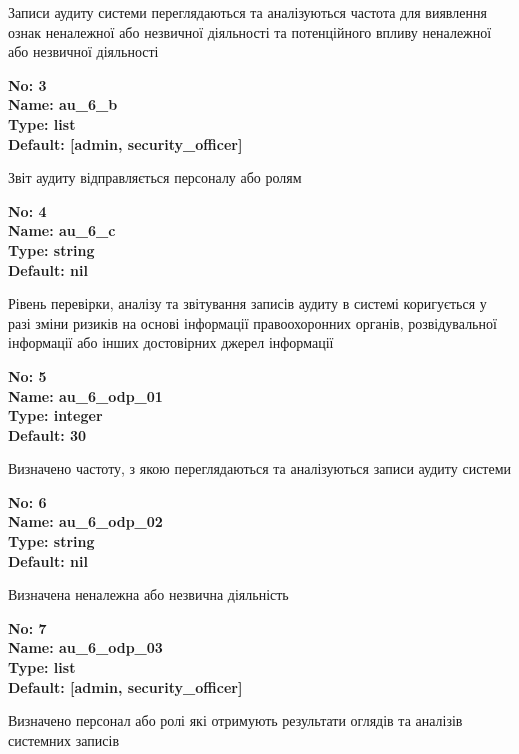 \documentclass{article}
\begin{document}
{\footnotesize Записи аудиту системи переглядаються та аналізуються частота для виявлення ознак неналежної або незвичної діяльності та потенційного впливу неналежної або незвичної діяльності}


{\footnotesize\bfseries
No: 3\\
Name: au\_\allowbreak{}6\_\allowbreak{}b\\
Type: list\\
Default: [\textquotedbl{}admin\textquotedbl{}, \textquotedbl{}security\_\allowbreak{}officer\textquotedbl{}]
}

{\footnotesize Звіт аудиту відправляється персоналу або ролям}


{\footnotesize\bfseries
No: 4\\
Name: au\_\allowbreak{}6\_\allowbreak{}c\\
Type: string\\
Default: nil
}

{\footnotesize Рівень перевірки, аналізу та звітування записів аудиту в системі коригується у разі зміни ризиків на основі інформації правоохоронних органів, розвідувальної інформації або інших достовірних джерел інформації}


{\footnotesize\bfseries
No: 5\\
Name: au\_\allowbreak{}6\_\allowbreak{}odp\_\allowbreak{}01\\
Type: integer\\
Default: 30
}

{\footnotesize Визначено частоту, з якою переглядаються та аналізуються записи аудиту системи}


{\footnotesize\bfseries
No: 6\\
Name: au\_\allowbreak{}6\_\allowbreak{}odp\_\allowbreak{}02\\
Type: string\\
Default: nil
}

{\footnotesize Визначена неналежна або незвична діяльність}


{\footnotesize\bfseries
No: 7\\
Name: au\_\allowbreak{}6\_\allowbreak{}odp\_\allowbreak{}03\\
Type: list\\
Default: [\textquotedbl{}admin\textquotedbl{}, \textquotedbl{}security\_\allowbreak{}officer\textquotedbl{}]
}

{\footnotesize Визначено персонал або ролі які отримують результати оглядів та аналізів системних записів}
\end{document}
